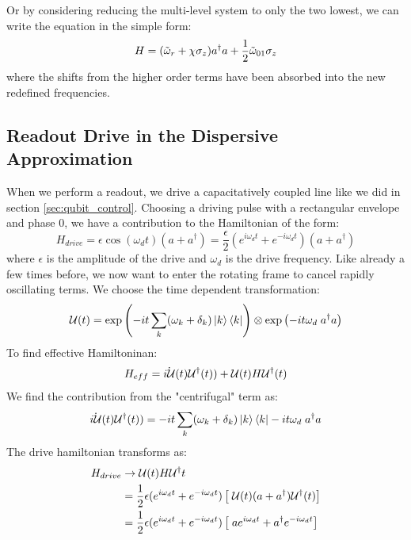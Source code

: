 Or by considering reducing the multi-level system to only the two lowest, we can write the equation in the simple form:
\begin{equation}\label{eq:two_level_qubit_dispersive}
    H = (\Tilde{\omega}_r + \chi \sigma_z) a^\dagger a + \frac12 \Tilde{\omega}_{01} \sigma_z
\end{equation}
where the shifts from the higher order terms have been absorbed into the new redefined frequencies. 



\subsection{Readout Drive in the Dispersive Approximation}
When we perform a readout, we drive a capacitatively coupled line like we did in section \ref{sec:qubit_control}. Choosing a driving pulse with a rectangular envelope and phase 0, we have a contribution to the Hamiltonian of the form:
\begin{equation}
    H_{drive} = \epsilon\cos(\omega_d t)(a + a^\dagger) = \frac{\epsilon}{2} \left(e^{i\omega_d t} + e^{-i\omega_d t}\right)(a + a^\dagger)    
\end{equation}
where $\epsilon$ is the amplitude of the drive and $\omega_d$ is the drive frequency. Like already a few times before, we now want to enter the rotating frame to cancel rapidly oscillating terms. We choose the time dependent transformation:
\begin{equation}
    \mathcal{U}(t) = \exp\left(- i t \sum_k (\omega_k + \delta_k) \ket{k}\bra{k}\right) \otimes \exp \left(- i t \omega_d \;  a^\dagger a \right)
\end{equation}
To find effective Hamiltoninan:
\begin{equation}
    H_{eff} = \dot{i \mathcal{U}}{(t)}\mathcal{U}^\dagger(t)) + \mathcal{U}(t) H \mathcal{U}^\dagger(t)
\end{equation}
We find the contribution from the "centrifugal" term as:
\begin{equation}
    \dot{i \mathcal{U}}{(t)}\mathcal{U}^\dagger(t)) = - i t \sum_k (\omega_k + \delta_k) \ket{k}\bra{k} - it \omega_d \;  a^\dagger a
\end{equation}
The drive hamiltonian transforms as:
\begin{align*}
    H_{drive} &\to \mathcal{U}(t) H_{} \mathcal{U}^\dagger{t} \\
    &= \frac12 \epsilon (e^{i\omega_d t} + e^{-i\omega_d t}) \left[ \; \mathcal{U}(t)  (a + a^\dagger) \mathcal{U}^\dagger(t)\right] \\
    &= \frac12 \epsilon (e^{i\omega_d t} + e^{-i\omega_d t}) \left[ \;a e^{i \omega_d t} + a^\dagger e^{-i \omega_d t} \right]
\end{align*}
